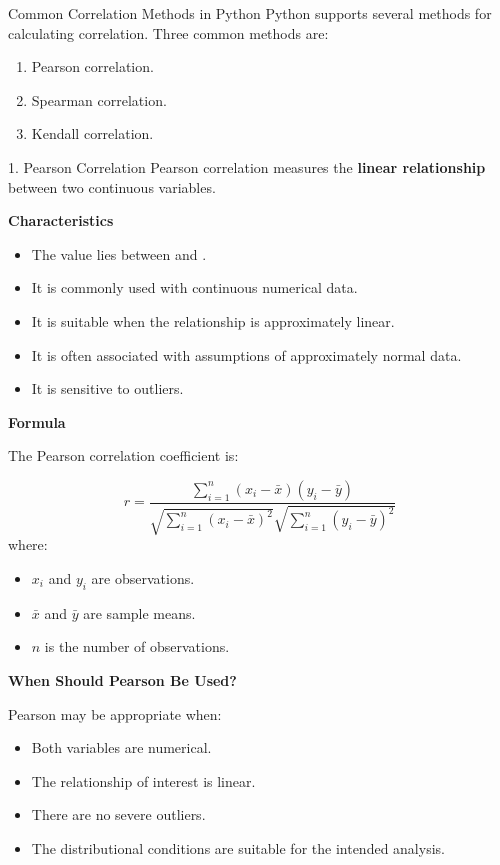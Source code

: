 \documentclass[aspectratio=169,11pt]{beamer}
\begin{document}
\begin{frame}[allowframebreaks]{Common Correlation Methods in Python}
\small
Python supports several methods for calculating correlation. Three common methods are:\par\medskip
\begin{enumerate}
\item Pearson correlation.
\item Spearman correlation.
\item Kendall correlation.
\end{enumerate}
\end{frame}
\begin{frame}[allowframebreaks]{1. Pearson Correlation}
\footnotesize
Pearson correlation measures the \textbf{linear relationship} between two continuous variables.\par\medskip
\textbf{Characteristics}\par\medskip
\begin{itemize}
\item The value lies between \texttt{} and \texttt{}.
\item It is commonly used with continuous numerical data.
\item It is suitable when the relationship is approximately linear.
\item It is often associated with assumptions of approximately normal data.
\item It is sensitive to outliers.
\end{itemize}
\textbf{Formula}\par\medskip
The Pearson correlation coefficient is:\par\medskip
$$
r =
\frac{
\sum_{i=1}^{n}(x_i-\bar{x})(y_i-\bar{y})
}{
\sqrt{\sum_{i=1}^{n}(x_i-\bar{x})^2}
\sqrt{\sum_{i=1}^{n}(y_i-\bar{y})^2}
}
$$
where:\par\medskip
\begin{itemize}
\item \(x_i\) and \(y_i\) are observations.
\item \(\bar{x}\) and \(\bar{y}\) are sample means.
\item \(n\) is the number of observations.
\end{itemize}
\textbf{When Should Pearson Be Used?}\par\medskip
Pearson may be appropriate when:\par\medskip
\begin{itemize}
\item Both variables are numerical.
\item The relationship of interest is linear.
\item There are no severe outliers.
\item The distributional conditions are suitable for the intended analysis.
\end{itemize}
\end{frame}
\end{document}
